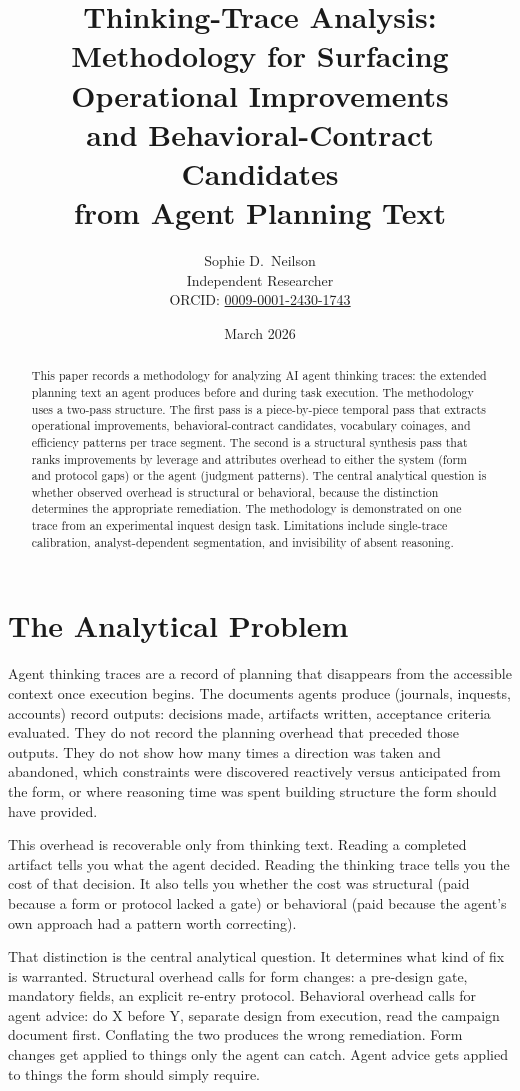 \documentclass[11pt,a4paper]{article}
\title{%
  Thinking-Trace Analysis: \\
  Methodology for Surfacing Operational Improvements \\
  and Behavioral-Contract Candidates \\
  from Agent Planning Text%
}
\author{Sophie D.\ Neilson \\
  \small Independent Researcher \\
  \small ORCID: \href{https://orcid.org/0009-0001-2430-1743}{0009-0001-2430-1743}
}
\date{March 2026}
\begin{document}
\maketitle

\begin{abstract}
This paper records a methodology for analyzing AI agent thinking traces: the
extended planning text an agent produces before and during task execution. The
methodology uses a two-pass structure. The first pass is a piece-by-piece
temporal pass that extracts operational improvements, behavioral-contract
candidates, vocabulary coinages, and efficiency patterns per trace segment. The
second is a structural synthesis pass that ranks improvements by leverage and
attributes overhead to either the system (form and protocol gaps) or the agent
(judgment patterns). The central analytical question is whether observed
overhead is structural or behavioral, because the distinction determines the
appropriate remediation. The methodology is demonstrated on one trace from an
experimental inquest design task. Limitations include single-trace calibration,
analyst-dependent segmentation, and invisibility of absent reasoning.
\end{abstract}

\section{The Analytical Problem}

Agent thinking traces are a record of planning that disappears from the
accessible context once execution begins. The documents agents produce
(journals, inquests, accounts) record outputs: decisions made, artifacts
written, acceptance criteria evaluated. They do not record the planning
overhead that preceded those outputs. They do not show how many times a
direction was taken and abandoned, which constraints were discovered reactively
versus anticipated from the form, or where reasoning time was spent building
structure the form should have provided.

This overhead is recoverable only from thinking text. Reading a completed
artifact tells you what the agent decided. Reading the thinking trace tells you
the cost of that decision. It also tells you whether the cost was structural
(paid because a form or protocol lacked a gate) or behavioral (paid because the
agent's own approach had a pattern worth correcting).

That distinction is the central analytical question. It determines what kind of
fix is warranted. Structural overhead calls for form changes: a pre-design
gate, mandatory fields, an explicit re-entry protocol. Behavioral overhead
calls for agent advice: do X before Y, separate design from execution, read the
campaign document first. Conflating the two produces the wrong remediation.
Form changes get applied to things only the agent can catch. Agent advice gets
applied to things the form should simply require.
\end{document}
